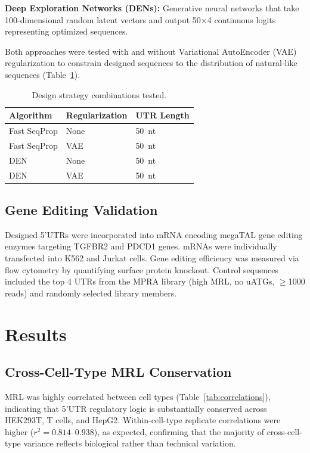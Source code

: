 \documentclass[12pt]{article}
\begin{document}
\textbf{Deep Exploration Networks (DENs):} Generative neural networks that take 100-dimensional random latent vectors and output 50$\times$4 continuous logits representing optimized sequences.

Both approaches were tested with and without Variational AutoEncoder (VAE) regularization \citep{kingma2013auto} to constrain designed sequences to the distribution of natural-like sequences (Table~\ref{tab:designs}).

\begin{table}[ht]
\centering
\caption{Design strategy combinations tested.}
\label{tab:designs}
\begin{tabular}{lll}
\toprule
Algorithm & Regularization & UTR Length \\
\midrule
Fast SeqProp & None & 50~nt \\
Fast SeqProp & VAE & 50~nt \\
DEN & None & 50~nt \\
DEN & VAE & 50~nt \\
\bottomrule
\end{tabular}
\end{table}

\subsection{Gene Editing Validation}

Designed 5'UTRs were incorporated into mRNA encoding megaTAL gene editing enzymes targeting TGFBR2 and PDCD1 genes. mRNAs were individually transfected into K562 and Jurkat cells. Gene editing efficiency was measured via flow cytometry by quantifying surface protein knockout. Control sequences included the top 4 UTRs from the MPRA library (high MRL, no uATGs, $\geq$1000 reads) and randomly selected library members.

\section{Results}

\subsection{Cross-Cell-Type MRL Conservation}

MRL was highly correlated between cell types (Table~\ref{tab:correlations}), indicating that 5'UTR regulatory logic is substantially conserved across HEK293T, T cells, and HepG2. Within-cell-type replicate correlations were higher ($r^2 = 0.814$--$0.938$), as expected, confirming that the majority of cross-cell-type variance reflects biological rather than technical variation.
\end{document}
